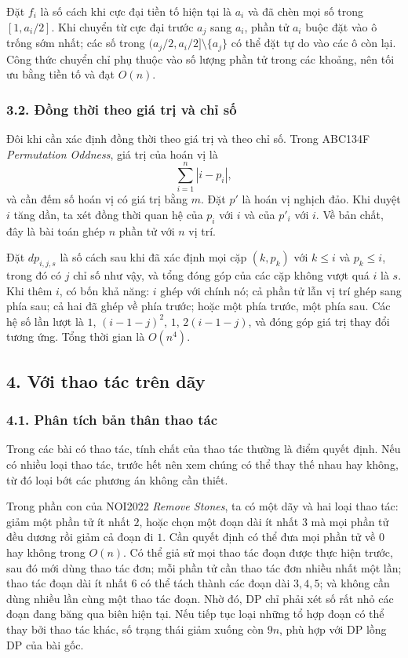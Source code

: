 \documentclass[11pt]{article}
\begin{document}
Đặt \(f_i\) là số cách khi cực đại tiền tố hiện tại là \(a_i\) và đã chèn mọi
số trong \([1,a_i/2]\). Khi chuyển từ cực đại trước \(a_j\) sang \(a_i\), phần
tử \(a_i\) buộc đặt vào ô trống sớm nhất; các số trong
\((a_j/2,a_i/2]\setminus\{a_j\}\) có thể đặt tự do vào các ô còn lại. Công thức
chuyển chỉ phụ thuộc vào số lượng phần tử trong các khoảng, nên tối ưu bằng
tiền tố và đạt \(O(n)\).

\subsubsection*{3.2. Đồng thời theo giá trị và chỉ số}

Đôi khi cần xác định đồng thời theo giá trị và theo chỉ số. Trong ABC134F
\emph{Permutation Oddness}, giá trị của hoán vị là
\[
  \sum_{i=1}^n |i-p_i|,
\]
và cần đếm số hoán vị có giá trị bằng \(m\). Đặt \(p'\) là hoán vị nghịch đảo.
Khi duyệt \(i\) tăng dần, ta xét đồng thời quan hệ của \(p_i\) với \(i\) và của
\(p'_i\) với \(i\). Về bản chất, đây là bài toán ghép \(n\) phần tử với \(n\)
vị trí.

Đặt \(dp_{i,j,s}\) là số cách sau khi đã xác định mọi cặp \((k,p_k)\) với
\(k\le i\) và \(p_k\le i\), trong đó có \(j\) chỉ số như vậy, và tổng đóng góp
của các cặp không vượt quá \(i\) là \(s\). Khi thêm \(i\), có bốn khả năng:
\(i\) ghép với chính nó; cả phần tử lẫn vị trí ghép sang phía sau; cả hai đã
ghép về phía trước; hoặc một phía trước, một phía sau. Các hệ số lần lượt là
\(1\), \((i-1-j)^2\), \(1\), \(2(i-1-j)\), và đóng góp giá trị thay đổi tương
ứng. Tổng thời gian là \(O(n^4)\).

\subsection*{4. Với thao tác trên dãy}

\subsubsection*{4.1. Phân tích bản thân thao tác}

Trong các bài có thao tác, tính chất của thao tác thường là điểm quyết định.
Nếu có nhiều loại thao tác, trước hết nên xem chúng có thể thay thế nhau hay
không, từ đó loại bớt các phương án không cần thiết.

Trong phần con của NOI2022 \emph{Remove Stones}, ta có một dãy và hai loại
thao tác: giảm một phần tử ít nhất \(2\), hoặc chọn một đoạn dài ít nhất \(3\)
mà mọi phần tử đều dương rồi giảm cả đoạn đi \(1\). Cần quyết định có thể đưa
mọi phần tử về \(0\) hay không trong \(O(n)\). Có thể giả sử mọi thao tác đoạn
được thực hiện trước, sau đó mới dùng thao tác đơn; mỗi phần tử cần thao tác
đơn nhiều nhất một lần; thao tác đoạn dài ít nhất \(6\) có thể tách thành các
đoạn dài \(3,4,5\); và không cần dùng nhiều lần cùng một thao tác đoạn. Nhờ
đó, DP chỉ phải xét số rất nhỏ các đoạn đang băng qua biên hiện tại. Nếu tiếp
tục loại những tổ hợp đoạn có thể thay bởi thao tác khác, số trạng thái giảm
xuống còn \(9n\), phù hợp với DP lồng DP của bài gốc.
\end{document}
